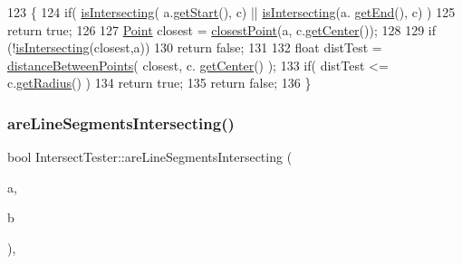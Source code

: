\begin{DoxyCode}
123 \{
124     \textcolor{keywordflow}{if}( \hyperlink{class_intersect_tester_a7710e17ff7d2e229059f23b9429213f5}{isIntersecting}( a.\hyperlink{class_line_segment_afcff6bd5f6a3073a44f7b21db0be876f}{getStart}(), c) || \hyperlink{class_intersect_tester_a7710e17ff7d2e229059f23b9429213f5}{isIntersecting}(a.
      \hyperlink{class_line_segment_a7b05f883c369b950e61009edfafbbd0e}{getEnd}(), c) )
125         \textcolor{keywordflow}{return} \textcolor{keyword}{true};
126 
127     \hyperlink{class_point}{Point} closest = \hyperlink{class_intersect_tester_a6bb20d4839643fbfd53a5d4506448a92}{closestPoint}(a, c.\hyperlink{class_circle_a9818ca0bbac64ff447945a8e51ff9319}{getCenter}());
128 
129     \textcolor{keywordflow}{if} (!\hyperlink{class_intersect_tester_a7710e17ff7d2e229059f23b9429213f5}{isIntersecting}(closest,a))
130         \textcolor{keywordflow}{return} \textcolor{keyword}{false};
131 
132     \textcolor{keywordtype}{float} distTest = \hyperlink{class_intersect_tester_a8eea20bc180b49008d29002fc4e2c7cf}{distanceBetweenPoints}( closest, c.
      \hyperlink{class_circle_a9818ca0bbac64ff447945a8e51ff9319}{getCenter}() );
133     \textcolor{keywordflow}{if}( distTest <= c.\hyperlink{class_circle_a95b7dc25d2e9b1e40a189cd83386a12e}{getRadius}() )
134         \textcolor{keywordflow}{return} \textcolor{keyword}{true};
135     \textcolor{keywordflow}{return} \textcolor{keyword}{false};
136 \}
\end{DoxyCode}
\mbox{\label{class_intersect_tester_a0552b121b444528907c1958c02fb217b}} 
\subsubsection{\texorpdfstring{are\+Line\+Segments\+Intersecting()}{areLineSegmentsIntersecting()}}
{\footnotesize\ttfamily bool Intersect\+Tester\+::are\+Line\+Segments\+Intersecting (\begin{DoxyParamCaption}\item[{\hyperlink{class_line_segment}{Line\+Segment}}]{a,  }\item[{\hyperlink{class_line_segment}{Line\+Segment}}]{b }\end{DoxyParamCaption})\hspace{0.3cm}{\ttfamily [static]}, {\ttfamily [private]}}



